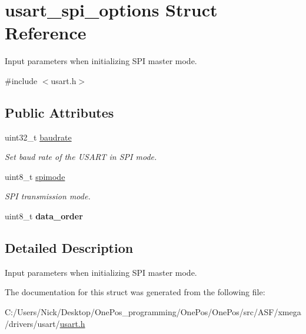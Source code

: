 \hypertarget{structusart__spi__options}{\section{usart\-\_\-spi\-\_\-options Struct Reference}
\label{structusart__spi__options}
}


Input parameters when initializing S\-P\-I master mode.  




{\ttfamily \#include $<$usart.\-h$>$}

\subsection*{Public Attributes}
\begin{DoxyCompactItemize}
\item 
\hypertarget{structusart__spi__options_a27ed83158a69f0559e669dbc73e42658}{uint32\-\_\-t \hyperlink{structusart__spi__options_a27ed83158a69f0559e669dbc73e42658}{baudrate}}\label{structusart__spi__options_a27ed83158a69f0559e669dbc73e42658}

\begin{DoxyCompactList}\small\item\em Set baud rate of the U\-S\-A\-R\-T in S\-P\-I mode. \end{DoxyCompactList}\item 
\hypertarget{structusart__spi__options_a040fbcccf480abf2d2b3dbd0402099b7}{uint8\-\_\-t \hyperlink{structusart__spi__options_a040fbcccf480abf2d2b3dbd0402099b7}{spimode}}\label{structusart__spi__options_a040fbcccf480abf2d2b3dbd0402099b7}

\begin{DoxyCompactList}\small\item\em S\-P\-I transmission mode. \end{DoxyCompactList}\item 
\hypertarget{structusart__spi__options_abe8952482151b1ce279e2b9bdc26d58c}{uint8\-\_\-t {\bfseries data\-\_\-order}}\label{structusart__spi__options_abe8952482151b1ce279e2b9bdc26d58c}

\end{DoxyCompactItemize}


\subsection{Detailed Description}
Input parameters when initializing S\-P\-I master mode. 

The documentation for this struct was generated from the following file\-:\begin{DoxyCompactItemize}
\item 
C\-:/\-Users/\-Nick/\-Desktop/\-One\-Pos\-\_\-programming/\-One\-Pos/\-One\-Pos/src/\-A\-S\-F/xmega/drivers/usart/\hyperlink{usart_8h}{usart.\-h}\end{DoxyCompactItemize}
